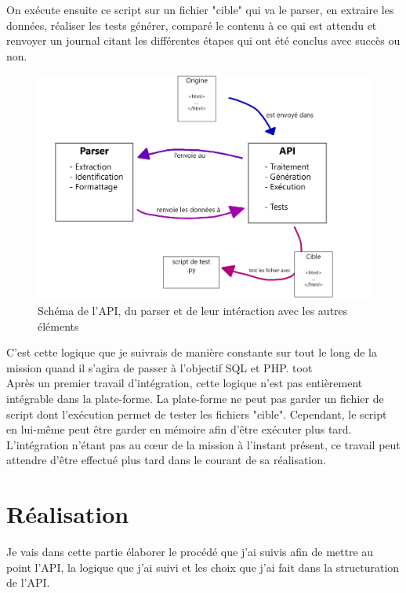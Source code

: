 On exécute ensuite ce script sur un fichier "cible" qui va le parser, en extraire les données, réaliser les tests générer, comparé le contenu à ce qui est attendu et renvoyer un journal citant les différentes étapes qui ont été conclus avec succès ou non.\\

\begin{figure}[ht]
\centering
\includegraphics[width=1\textwidth]{schema.png}
\caption{\label{fig:schema}Schéma de l'API, du parser et de leur intéraction avec les autres éléments}
\end{figure}

C'est cette logique que je suivrais de manière constante sur tout le long de la mission quand il s'agira de passer à l'objectif SQL et PHP. toot\\

Après un premier travail d'intégration, cette logique n'est pas entièrement intégrable dans la plate-forme. La plate-forme ne peut pas garder un fichier de script dont l'exécution permet de tester les fichiers "cible". Cependant, le script en lui-même peut être garder en mémoire afin d'être exécuter plus tard. L'intégration n'étant pas au cœur de la mission à l'instant présent, ce travail peut attendre d'être effectué plus tard dans le courant de sa réalisation.\\

\section{Réalisation}

Je vais dans cette partie élaborer le procédé que j'ai suivis afin de mettre au point l'API, la logique que j'ai suivi et les choix que j'ai fait dans la structuration de l'API.\\

